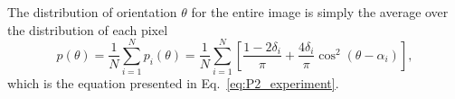 \documentclass[]{interact}
\begin{document}
The distribution of orientation $\theta$ for the entire image is simply the average over the distribution of each pixel
%
\begin{equation}
p(\theta) = \frac{1}{N} \sum_{i=1}^N p_i(\theta) = \frac{1}{N} \sum_{i=1}^N \left[ \frac{1-2\delta_i}{\pi} + \frac{4 \delta_i}{\pi}\cos^2(\theta-\alpha_i) \right],
\end{equation}
%
which is the equation presented in Eq.\ \eqref{eq:P2_experiment}.
\end{document}
